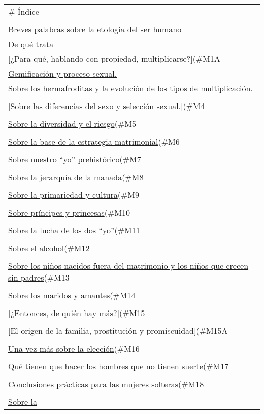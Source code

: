 \begin{longtable}[]{@{}l@{}}
\toprule
\# Índice\tabularnewline
\tabularnewline
\protect\hyperlink{M02}{Breves palabras sobre la etología del ser
humano}\tabularnewline
\protect\hyperlink{M1}{De qué trata}\tabularnewline
{[}¿Para qué, hablando con propiedad,
multiplicarse?{]}(\#M1A\tabularnewline
\protect\hyperlink{M2}{Gemificación y proceso sexual.}\tabularnewline
\protect\hyperlink{M3}{Sobre los hermafroditas y la evolución de los
tipos de multiplicación.}\tabularnewline
\tabularnewline
{[}Sobre las diferencias del sexo y selección
sexual.{]}(\#M4\tabularnewline
\tabularnewline
\protect\hyperlink{sobre-la-diversidad-y-el-riesgo}{Sobre la diversidad
y el riesgo}(\#M5\tabularnewline
\tabularnewline
\protect\hyperlink{sobre-la-base-de-la-estrategia-matrimonial}{Sobre la
base de la estrategia matrimonial}(\#M6\tabularnewline
\tabularnewline
\protect\hyperlink{sobre-nuestro-yo-prehistuxf3rico}{Sobre nuestro
``yo'' prehistórico}(\#M7\tabularnewline
\tabularnewline
\protect\hyperlink{sobre-la-jerarquuxeda-de-la-manada}{Sobre la
jerarquía de la manada}(\#M8\tabularnewline
\tabularnewline
\protect\hyperlink{sobre-la-primariedad-y-cultura}{Sobre la primariedad
y cultura}(\#M9\tabularnewline
\tabularnewline
\protect\hyperlink{sobre-pruxedncipes-y-princesas}{Sobre príncipes y
princesas}(\#M10\tabularnewline
\tabularnewline
\protect\hyperlink{sobre-la-lucha-de-los-dos-yo}{Sobre la lucha de los
dos ``yo''}(\#M11\tabularnewline
\tabularnewline
\protect\hyperlink{sobre-el-alcohol}{Sobre el
alcohol}(\#M12\tabularnewline
\tabularnewline
\protect\hyperlink{sobre-los-niuxf1os-nacidos-fuera-del-matrimonio-y-los-niuxf1os-que-crecen-sin-padres}{Sobre
los niños nacidos fuera del matrimonio y los niños que crecen sin
padres}(\#M13\tabularnewline
\tabularnewline
\protect\hyperlink{sobre-los-maridos-y-amantes}{Sobre los maridos y
amantes}(\#M14\tabularnewline
\tabularnewline
{[}¿Entonces, de quién hay más?{]}(\#M15\tabularnewline
\tabularnewline
{[}El origen de la familia, prostitución y
promiscuidad{]}(\#M15A\tabularnewline
\tabularnewline
\protect\hyperlink{una-vez-muxe1s-sobre-la-elecciuxf3n}{Una vez más
sobre la elección}(\#M16\tabularnewline
\tabularnewline
\protect\hyperlink{quuxe9-tienen-que-hacer-los-hombres-que-no-tienen-suerte}{Qué
tienen que hacer los hombres que no tienen suerte}(\#M17\tabularnewline
\tabularnewline
\protect\hyperlink{conclusiones-pruxe1cticas-para-las-mujeres-solteras}{Conclusiones
prácticas para las mujeres solteras}(\#M18\tabularnewline
\tabularnewline
\protect\hyperlink{sobre-la-valentuxeda-y-humillaciuxf3n}{Sobre la
}
\end{longtable}

